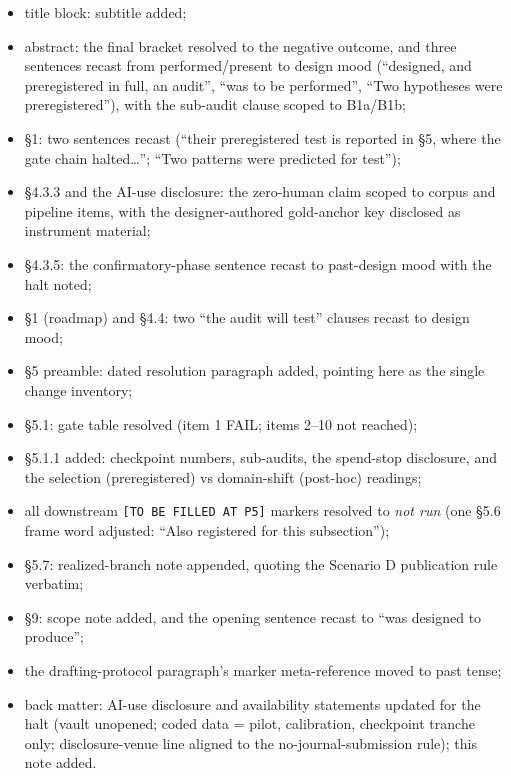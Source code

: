 \begin{itemize}
\tightlist
\item
  title block: subtitle added;
\item
  abstract: the final bracket resolved to the negative outcome, and three sentences recast from performed/present to design mood (``designed, and preregistered in full, an audit'', ``was to be performed'', ``Two hypotheses were preregistered''), with the sub-audit clause scoped to B1a/B1b;
\item
  \S{}1: two sentences recast (``their preregistered test is reported in \S{}5, where the gate chain halted\ldots{}''; ``Two patterns were predicted for test'');
\item
  \S{}4.3.3 and the AI-use disclosure: the zero-human claim scoped to corpus and pipeline items, with the designer-authored gold-anchor key disclosed as instrument material;
\item
  \S{}4.3.5: the confirmatory-phase sentence recast to past-design mood with the halt noted;
\item
  \S{}1 (roadmap) and \S{}4.4: two ``the audit will test'' clauses recast to design mood;
\item
  \S{}5 preamble: dated resolution paragraph added, pointing here as the single change inventory;
\item
  \S{}5.1: gate table resolved (item 1 FAIL; items 2--10 not reached);
\item
  \S{}5.1.1 added: checkpoint numbers, sub-audits, the spend-stop disclosure, and the selection (preregistered) vs domain-shift (post-hoc) readings;
\item
  all downstream \texttt{{[}TO\ BE\ FILLED\ AT\ P5{]}} markers resolved to \emph{not run} (one \S{}5.6 frame word adjusted: ``Also registered for this subsection'');
\item
  \S{}5.7: realized-branch note appended, quoting the Scenario D publication rule verbatim;
\item
  \S{}9: scope note added, and the opening sentence recast to ``was designed to produce'';
\item
  the drafting-protocol paragraph's marker meta-reference moved to past tense;
\item
  back matter: AI-use disclosure and availability statements updated for the halt (vault unopened; coded data = pilot, calibration, checkpoint tranche only; disclosure-venue line aligned to the no-journal-submission rule); this note added.
\end{itemize}

